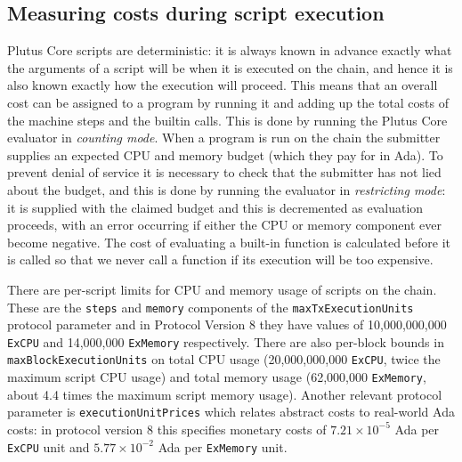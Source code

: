 \documentclass[a4paper]{article}
\begin{document}
\subsection{Measuring costs during script execution}  Plutus Core scripts
are deterministic: it is always known in advance exactly what the arguments of a
script will be when it is executed on the chain, and hence it is also known
exactly how the execution will proceed.  This means that an overall cost can be
assigned to a program by running it and adding up the total costs of the machine
steps and the builtin calls.  This is done by running the Plutus Core evaluator
in \textit{counting mode}.  When a program is run on the chain the submitter
supplies an expected CPU and memory budget (which they pay for in Ada).  To
prevent denial of service it is necessary to check that the submitter has not
lied about the budget, and this is done by running the evaluator in
\textit{restricting mode}: it is supplied with the claimed budget and this is
decremented as evaluation proceeds, with an error occurring if either the CPU or
memory component ever become negative.  The cost of evaluating a built-in
function is calculated before it is called so that we never call a function if
its execution will be too expensive.


There are per-script limits for CPU and memory usage of scripts on the chain.
These are the \texttt{steps} and \texttt{memory} components of the
\texttt{maxTxExecution\-Units} protocol parameter and in Protocol Version 8 they
have values of 10,000,000,000 \texttt{ExCPU} and 14,000,000 \texttt{ExMemory}
respectively.  There are also per-block bounds in
\texttt{maxBlock\-Exe\-cutionUnits} on total CPU usage (20,000,000,000
\texttt{ExCPU}, twice the maximum script CPU usage) and total memory usage
(62,000,000 \texttt{ExMemory}, about 4.4 times the maximum script memory usage).
Another relevant protocol parameter is \texttt{executionUnitPrices} which
relates abstract costs to real-world Ada costs: in protocol version 8 this
specifies monetary costs of $7.21\times10^{-5}$ Ada per \texttt{ExCPU} unit and
$5.77\times10^{-2}$ Ada per \texttt{ExMemory} unit.
\end{document}
